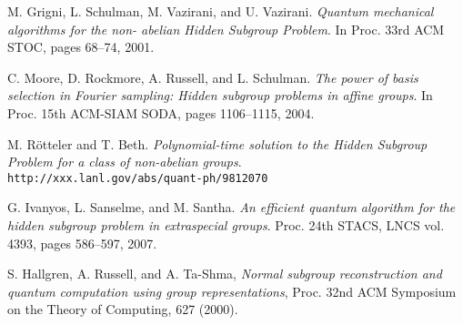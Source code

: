 \documentclass[conference]{IEEEtran}
\begin{document}
%
%
%
\begin{thebibliography}{1}  %
	 M. Grigni, L. Schulman, M. Vazirani, and U. Vazirani. \textit{Quantum mechanical algorithms for the non- abelian Hidden Subgroup Problem}. In Proc. 33rd ACM STOC, pages 68–74, 2001.
	
	C. Moore, D. Rockmore, A. Russell, and L. Schulman. \textit{The power of basis selection in Fourier sampling: Hidden subgroup problems in affine groups}. In Proc. 15th ACM-SIAM SODA, pages 1106–1115, 2004.

    M. R{\"o}tteler and T. Beth.
	\textit{Polynomial-time solution to the Hidden Subgroup Problem for a class of non-abelian groups}. \\\texttt{http://xxx.lanl.gov/abs/quant-ph/9812070}
	
	G. Ivanyos, L. Sanselme, and M. Santha. \textit{An efficient quantum algorithm for the hidden subgroup problem in extraspecial groups}. Proc. 24th STACS, LNCS vol. 4393, pages 586–597, 2007.
    
  S. Hallgren, A. Russell, and A. Ta-Shma,
  {\em Normal subgroup reconstruction and quantum computation using group
  representations},
  Proc. 32nd ACM Symposium on the Theory of Computing, 627 (2000).
	
	
\end{thebibliography}




\end{document}
